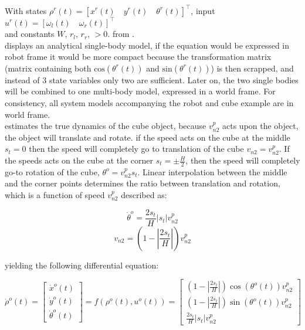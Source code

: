 \noindent With states $\rho^r(t) = \left[x^r(t) \quad y^r(t) \quad \theta^r(t)\right]^\top$, input $u^r(t)=\left[\omega_l(t) \quad \omega_r(t) \right]^\top$\\and constants $W$, $r_l$, $r_r$, $ > 0$.   from \cite{seegmiller_vehicle_2013}.\\

 displays an analytical single-body model, if the equation would be expressed in robot frame it would be more compact because the transformation matrix (matrix containing both $\text{cos}(\theta^r(t))$ and $\text{sin}(\theta^r(t))$) is then scrapped, and instead of 3 state variables only two are sufficient. Later on, the two single bodies will be combined to one multi-body model, expressed in a world frame. For consistency, all system models accompanying the robot and cube example are in world frame.\\

  estimates the true dynamics of the cube object, because $v^p_{n2}$ acts upon the object, the object will translate and rotate. if the speed acts on the cube at the middle $s_t = 0$ then the speed will completely go to translation of the cube $v_{n2} = v^p_{n2}$. If the speeds acts on the cube at the corner $s_t = \pm \frac{H}{2}$, then the speed will completely go-to rotation of the cube, $\theta^o = v^p_{n2}s_t$. Linear interpolation between the middle and the corner points determines the ratio between translation and rotation, which is a function of speed $v^p_{n2}$  described as:

$$\dot{\theta}^o = \frac{2 s_t}{H} |s_t| v_{n2}^p$$
$$v_{n2} = (1-|\frac{2 s_t}{H}|) v_{n2}^p$$

yielding the following differential equation:

\begin{equation}
\dot{\rho}^o(t)
=
\left[\begin{array}{l}
\dot{x}^o(t) \\
\dot{y}^o(t) \\
\dot{\theta}^o(t)
\end{array}\right]
=
f(\rho^o(t), u^o(t))
=
\left[\begin{array}{c}
(1-|\frac{2 s_t}{H}|) \cos (\theta^o(t))v^p_{n2} \\
(1-|\frac{2 s_t}{H}|) \sin (\theta^o(t))v^p_{n2} \\
\frac{2 s_t}{H}|s_t|v^p_{n2}
\end{array}\right]
\label{equation: differential_equation_square_object}
\end{equation}

